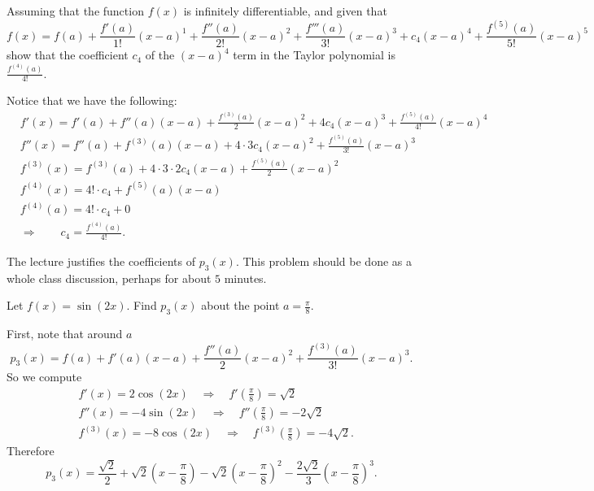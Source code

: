 \documentclass[handout]{ximera}
\begin{document}
\begin{problem}
Assuming that the function $f(x)$ is infinitely differentiable, and given that
	\[
	f(x) = f(a) + \frac{f'(a)}{1!}(x-a)^1 + \frac{f''(a)}{2!}(x-a)^2 + \frac{f'''(a)}{3!}(x-a)^3 + c_4 (x-a)^4 + \frac{f^{(5)}(a)}{5!}(x-a)^5
	\]
show that the coefficient $c_4$ of the $(x-a)^4$ term in the Taylor polynomial is $\frac{f^{(4)}(a)}{4!}$.  
	\begin{freeResponse}
	Notice that we have the following:
		\begin{align*}
		&f'(x) =  f'(a) + f''(a)(x-a) + \frac{f^{(3)}(a)}{2} (x-a)^2 + 4 c_4 (x-a)^3 + \frac{f^{(5)}(a)}{4!}(x-a)^4  \\
		&f''(x) =  f''(a) + f^{(3)}(a) (x-a) + 4 \cdot 3 c_4 (x-a)^2 + \frac{f^{(5)}(a)}{3!}(x-a)^3  \\
		&f^{(3)}(x) =  f^{(3)}(a) + 4 \cdot 3 \cdot 2 c_4 (x-a)  + \frac{f^{(5)}(a)}{2}(x-a)^2 \\
		&f^{(4)}(x) =   4! \cdot c_4 + f^{(5)}(a)(x-a)  \\
		&f^{(4)}(a) = 4! \cdot c_4 + 0  \\
		&\Longrightarrow \qquad \boxed{c_4 = \frac{f^{(4)}(a)}{4!}}.
		\end{align*}
	\end{freeResponse}
	
\end{problem}

\begin{instructorNotes}
The lecture justifies the coefficients of $p_3(x)$.  
This problem should be done as a whole class discussion, perhaps for about $5$ minutes.  
\end{instructorNotes}







\begin{problem}
Let $f(x) = \sin(2x)$.  
Find $p_3(x)$ about the point $a = \frac{\pi}{8}$.  
	\begin{freeResponse}
	First, note that around $a$
		\[
		p_3(x) = f(a) + f'(a)(x-a) + \frac{f''(a)}{2}(x-a)^2 + \frac{f^{(3)}(a)}{3!}(x-a)^3.
		\]
	So we compute
		\begin{align*}
		&f'(x) = 2 \cos(2x) 	\quad	\Longrightarrow	\quad	f' \left( \frac{\pi}{8} \right) = \sqrt{2}  \\
		&f''(x) = -4\sin(2x) 	\quad	\Longrightarrow	\quad	f'' \left( \frac{\pi}{8} \right) = - 2 \sqrt{2}  \\
		&f^{(3)}(x) = -8\cos(2x)	\quad	\Longrightarrow	\quad	f^{(3)} \left( \frac{\pi}{8} \right) = -4\sqrt{2}.
		\end{align*}
	Therefore
		\[
		\boxed{p_3(x) = \frac{\sqrt{2}}{2} + \sqrt{2} \left( x - \frac{\pi}{8} \right) - \sqrt{2} \left( x - \frac{\pi}{8} \right)^2 - \frac{2\sqrt{2}}{3} \left( x - \frac{\pi}{8} \right)^3}.
		\]
	\end{freeResponse}
		
\end{problem}
\end{document}

